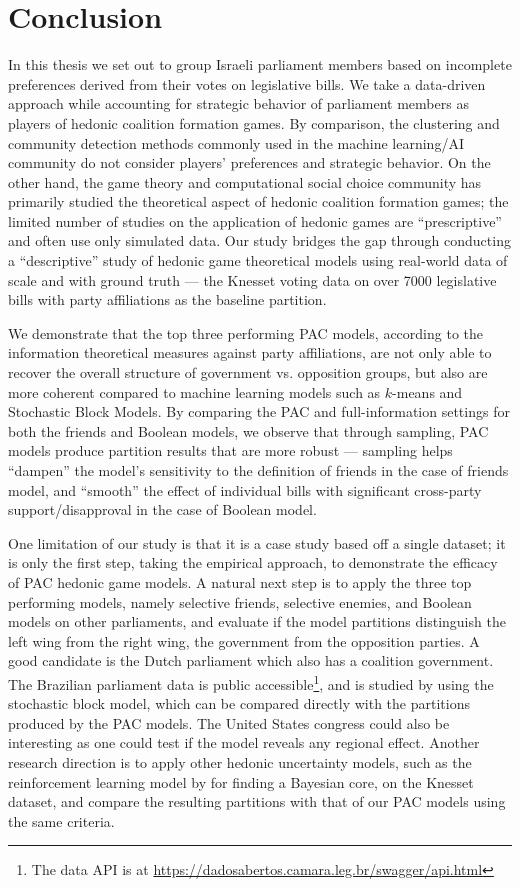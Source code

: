 \chapter{Conclusion}
\label{ch:concl}

In this thesis we set out to group Israeli parliament members
based on incomplete preferences derived from their votes on legislative bills.
We take a data-driven approach while accounting for strategic behavior of
parliament members as players of hedonic coalition formation games.
By comparison, the clustering and community detection methods commonly used in
the machine learning/AI community do not consider players' preferences and
strategic behavior.
On the other hand, the game theory and computational social choice community has primarily
studied the theoretical aspect of hedonic coalition formation games;
the limited number of studies on the application of hedonic games are
``prescriptive'' and often use only simulated data.
Our study bridges the gap through conducting a ``descriptive'' study of hedonic
game theoretical models using real-world data of scale and with ground truth ---
the Knesset voting data on over 7000 legislative bills with party affiliations as
the baseline partition.

We demonstrate that the top three performing PAC models, according to the
information theoretical measures against party affiliations, are not only able
to recover the overall structure of government vs. opposition groups, but also
are more coherent compared to machine learning models such as $k$-means and
Stochastic Block Models.
By comparing the PAC and full-information settings for both the friends
and Boolean models, we observe that through sampling, PAC models produce
partition results that are more robust --- sampling helps ``dampen'' the
model's sensitivity to the definition of friends in the case of friends model,
and ``smooth'' the effect of individual bills with significant cross-party
support/disapproval in the case of Boolean model.

One limitation of our study is that it is a case study based off a single
dataset; it is only the first step, taking the empirical approach, to
demonstrate the efficacy of PAC hedonic game models.
A natural next step is to apply the three top performing models, namely
selective friends, selective enemies, and Boolean models on other parliaments,
and evaluate if the model partitions distinguish the left wing from the right
wing, the government from the opposition parties.
A good candidate is the Dutch parliament which also has a coalition government. 
The Brazilian parliament data is public accessible\footnote{The data API is at
\url{https://dadosabertos.camara.leg.br/swagger/api.html}}, and is studied by
 using the stochastic block model, which can be compared
directly with the partitions produced by the PAC models.
The United States congress could also be interesting as one could test if the
model reveals any regional effect.
Another research direction is to apply other hedonic uncertainty models, such
as the reinforcement learning model by  for
finding a Bayesian core, on the Knesset dataset, and compare the resulting
partitions with that of our PAC models using the same criteria.